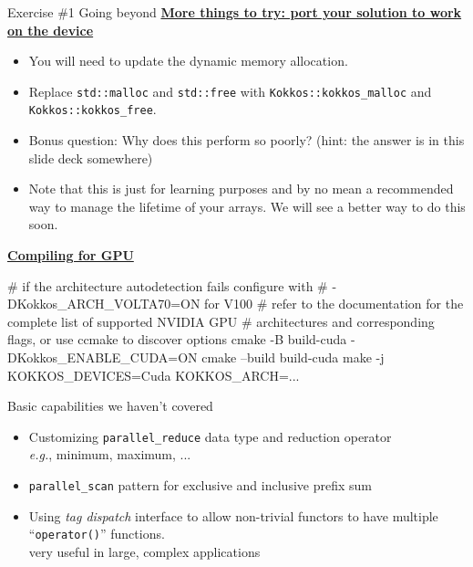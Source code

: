 
\iffull
\begin{frame}[fragile]{Exercise \#1 Going beyond}
   \ul{\textbf{More things to try: port your solution to work on the device}}
   \begin{itemize}
     \item You will need to update the dynamic memory allocation.
     \item Replace \texttt{std::malloc} and \texttt{std::free} with \texttt{Kokkos::kokkos\_malloc} and \texttt{Kokkos::kokkos\_free}.
     \item Bonus question:  Why does this perform so poorly?  (hint: the answer is in this slide deck somewhere)
     \item Note that this is just for learning purposes and by no mean a recommended way to manage the lifetime of your arrays.  We will see a better way to do this soon.
   \end{itemize}

   \ul{\textbf{Compiling for GPU}}
  \vspace{-3pt}
  \begin{small}
  \begin{code}
  # if the architecture autodetection fails configure with
  # -DKokkos_ARCH_VOLTA70=ON for V100
  # refer to the documentation for the complete list of supported NVIDIA GPU
  # architectures and corresponding flags, or use ccmake to discover options
    cmake -B build-cuda -DKokkos_ENABLE_CUDA=ON
    cmake --build build-cuda
    make -j KOKKOS_DEVICES=Cuda KOKKOS_ARCH=...
  \end{code}
  \end{small}
\end{frame}
\fi


\iffull
\begin{frame}[fragile]{Basic capabilities we haven't covered}

  \begin{itemize}

  \item {Customizing \texttt{parallel\_reduce} data type and reduction operator
    \\ \hspace{10pt} \emph{e.g.}, minimum, maximum, ...}

  \item {\texttt{parallel\_scan} pattern for exclusive and inclusive prefix sum}

  \item {Using \textit{tag dispatch} interface to allow non-trivial functors to have multiple ``\texttt{operator()}'' functions.
    \\ \hspace{10pt} very useful in large, complex applications}

  \end{itemize}

\end{frame}
\fi

